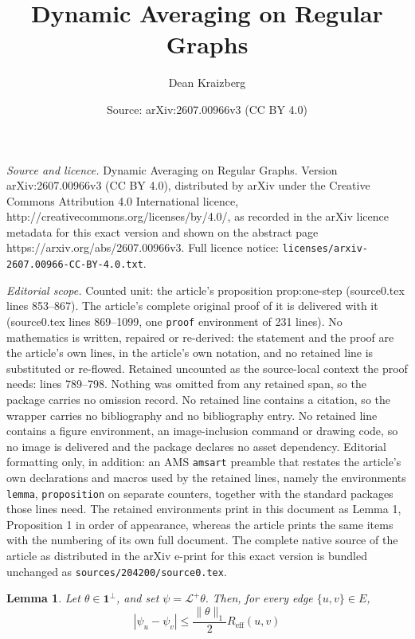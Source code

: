 \documentclass[10pt,a4paper]{amsart}
\title{Dynamic Averaging on Regular Graphs}
\author{Dean Kraizberg}
\date{Source: arXiv:2607.00966v3 (CC BY 4.0)}
\newtheorem{lemma}{Lemma}
\begin{document}
\maketitle

\noindent\emph{Source and licence.} Dynamic Averaging on Regular Graphs. Version arXiv:2607.00966v3 (CC BY 4.0), distributed by arXiv under the Creative Commons Attribution 4.0 International licence, http://creativecommons.org/licenses/by/4.0/, as recorded in the arXiv licence metadata for this exact version and shown on the abstract page https://arxiv.org/abs/2607.00966v3. Full licence notice: \texttt{licenses/arxiv-2607.00966-CC-BY-4.0.txt}.\par\smallskip

\noindent\textit{Editorial scope.} Counted unit: the article's proposition prop:one-step (source0.tex lines 853--867). The article's complete original proof of it is delivered with it (source0.tex lines 869--1099, one \texttt{proof} environment of 231 lines). No mathematics is written, repaired or re-derived: the statement and the proof are the article's own lines, in the article's own notation, and no retained line is substituted or re-flowed.  Retained uncounted as the source-local context the proof needs: lines 789--798.  Nothing was omitted from any retained span, so the package carries no omission record.  No retained line contains a citation, so the wrapper carries no bibliography and no bibliography entry.  No retained line contains a figure environment, an image-inclusion command or drawing code, so no image is delivered and the package declares no asset dependency.  Editorial formatting only, in addition: an AMS \texttt{amsart} preamble that restates the article's own declarations and macros used by the retained lines, namely the environments \texttt{lemma}, \texttt{proposition} on separate counters, together with the standard packages those lines need.  The retained environments print in this document as Lemma 1, Proposition 1 in order of appearance, whereas the article prints the same items with the numbering of its own full document.  The complete native source of the article as distributed in the arXiv e-print for this exact version is bundled unchanged as \texttt{sources/204200/source0.tex}.
\begin{lemma}
\label{lem:voltage-bound}
Let \(\theta\in \mathbf 1^{\perp}\), and set \(\psi=\mathcal L^+\theta.\)
Then, for every edge \(\{u,v\}\in E\),
\[
|\psi_u-\psi_v|
\le
\frac{\|\theta\|_1}{2}R_{\mathrm{eff}}(u,v)
\]
\end{lemma}
\end{document}
